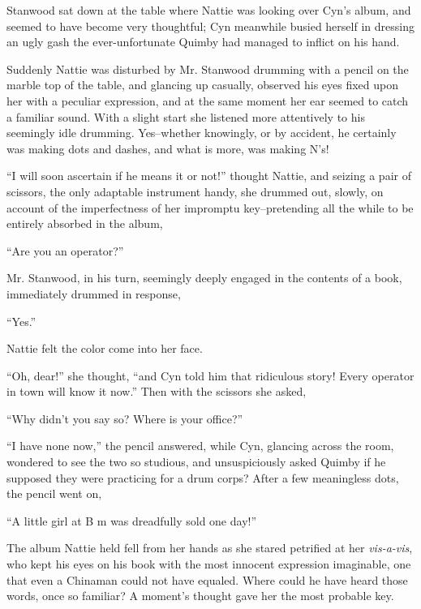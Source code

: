 

 Stanwood sat down at the table where Nattie was looking over Cyn's
album, and seemed to have become very thoughtful; Cyn meanwhile busied
herself in dressing an ugly gash the ever-unfortunate Quimby had managed
to inflict on his hand.

Suddenly Nattie was disturbed by Mr. Stanwood drumming with a pencil on
the marble top of the table, and glancing up casually, observed his eyes
fixed upon her with a peculiar expression, and at the same moment her
ear seemed to catch a familiar sound. With a slight start she listened
more attentively to his seemingly idle drumming. Yes--whether knowingly,
or by accident, he certainly was making dots and dashes, and what is
more, was making N's!

``I will soon ascertain if he means it or not!'' thought Nattie, and
seizing a pair of scissors, the only adaptable instrument handy, she
drummed out, slowly, on account of the imperfectness of her impromptu
key--pretending all the while to be entirely absorbed in the album,

``Are you an operator?''

Mr. Stanwood, in his turn, seemingly deeply engaged in the contents of a
book, immediately drummed in response,

``Yes.''

Nattie felt the color come into her face.

``Oh, dear!'' she thought, ``and Cyn told him that ridiculous story! Every
operator in town will know it now.'' Then with the scissors she asked,

``Why didn't you say so? Where is your office?''

``I have none now,'' the pencil answered, while Cyn, glancing across the
room, wondered to see the two so studious, and unsuspiciously asked
Quimby if he supposed they were practicing for a drum corps? After a few
meaningless dots, the pencil went on,

``A little girl at B m was dreadfully sold one day!''

The album Nattie held fell from her hands as she stared petrified at her
\emph{vis-a-vis}, who kept his eyes on his book with the most innocent
expression imaginable, one that even a Chinaman could not have equaled.
Where could he have heard those words, once so familiar? A moment's
thought gave her the most probable key.


